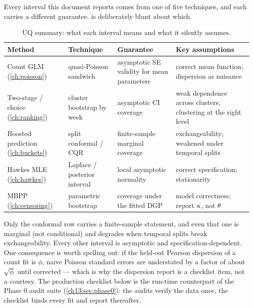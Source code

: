 Every interval this document reports comes from one of five techniques, and each carries a different
guarantee.  is deliberately blunt about which.

\begin{table}[htbp]
\centering
\footnotesize
\begin{tabular}{p{2.9cm}p{2.9cm}p{3.4cm}p{4.2cm}}
\toprule
Method & Technique & Guarantee & Key assumptions \\
\midrule
Count GLM (\cref{ch:poisson}) & quasi-Poisson sandwich & asymptotic SE validity for mean parameters & correct mean function; dispersion as nuisance \\
Two-stage / choice (\cref{ch:ranking}) & cluster bootstrap by week & asymptotic CI coverage & weak dependence across clusters; clustering at the right level \\
Boosted prediction (\cref{ch:buckets}) & split conformal / CQR \citep{romano2019} & finite-sample marginal coverage & exchangeability; weakened under temporal splits \\
Hawkes MLE (\cref{ch:hawkes}) & Laplace / posterior interval & local asymptotic normality & correct specification; stationarity \\
MBPP (\cref{ch:censoring}) & parametric bootstrap & coverage under the fitted DGP & model correctness; report $\kappa$, not $\theta$ \\
\bottomrule
\end{tabular}
\caption{UQ summary: what each interval means and what it silently assumes.}
\label{chcp:tab:uq}
\end{table}

Only the conformal row carries a finite-sample statement, and even that one is marginal (not conditional) and
degrades when temporal splits break exchangeability. Every other interval is asymptotic and
specification-dependent. One consequence is worth spelling out: if the held-out Pearson dispersion of a count
fit is $\phi$, naive Poisson standard errors are understated by a factor of about $\sqrt{\phi}$ until
corrected --- which is why the dispersion report is a checklist item, not a courtesy. The production checklist
below is the run-time counterpart of the Phase 0 audit suite (\cref{ch13:sec:phase0}): the audits verify the
data once, the checklist binds every fit and report thereafter.


